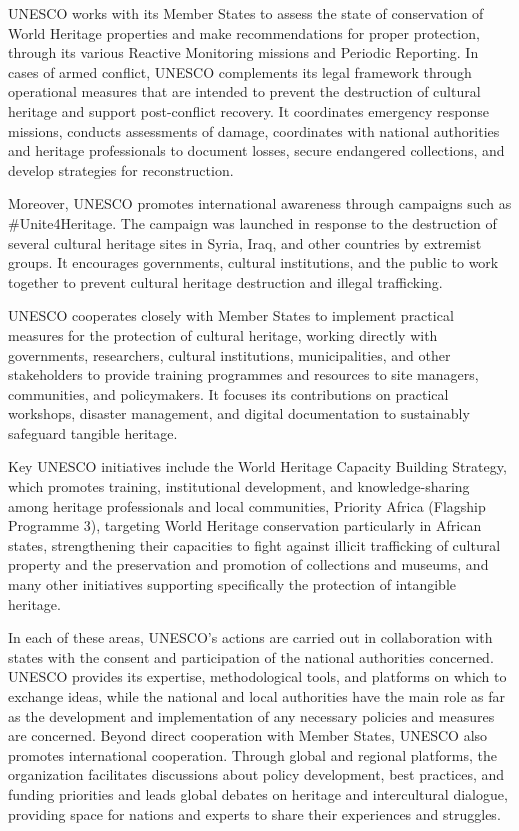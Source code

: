 UNESCO works with its Member States to assess the state of conservation of World Heritage properties and make recommendations for proper protection, through its various Reactive Monitoring missions and Periodic Reporting. In cases of armed conflict, UNESCO complements its legal framework through operational measures that are intended to prevent the destruction of cultural heritage and support post-conflict recovery. It coordinates emergency response missions, conducts assessments of damage, coordinates with national authorities and heritage professionals to document losses, secure endangered collections, and develop strategies for reconstruction.

Moreover, UNESCO promotes international awareness through campaigns such as \#Unite4Heritage. The campaign was launched in response to the destruction of several cultural heritage sites in Syria, Iraq, and other countries by extremist groups. It encourages governments, cultural institutions, and the public to work together to prevent cultural heritage destruction and illegal trafficking.

UNESCO cooperates closely with Member States to implement practical measures for the protection of cultural heritage, working directly with governments, researchers, cultural institutions, municipalities, and other stakeholders to provide training programmes and resources to site managers, communities, and policymakers. It focuses its contributions on practical workshops, disaster management, and digital documentation to sustainably safeguard tangible heritage.

Key UNESCO initiatives include the World Heritage Capacity Building Strategy, which promotes training, institutional development, and knowledge-sharing among heritage professionals and local communities, Priority Africa (Flagship Programme 3), targeting World Heritage conservation particularly in African states, strengthening their capacities to fight against illicit trafficking of cultural property and the preservation and promotion of collections and museums, and many other initiatives supporting specifically the protection of intangible heritage.

In each of these areas, UNESCO's actions are carried out in collaboration with states with the consent and participation of the national authorities concerned. UNESCO provides its expertise, methodological tools, and platforms on which to exchange ideas, while the national and local authorities have the main role as far as the development and implementation of any necessary policies and measures are concerned. Beyond direct cooperation with Member States, UNESCO also promotes international cooperation. Through global and regional platforms, the organization facilitates discussions about policy development, best practices, and funding priorities and leads global debates on heritage and intercultural dialogue, providing space for nations and experts to share their experiences and struggles.

